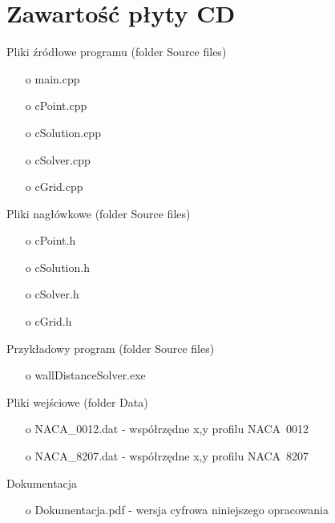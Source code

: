 \chapter{Zawartość płyty CD}

\noindent Pliki źródłowe programu (folder \textsf{Source files})
\begin{itemize}
	\item[o] \textsf{main.cpp} 
	\item[o] \textsf{cPoint.cpp} 
	\item[o] \textsf{cSolution.cpp} 
	\item[o] \textsf{cSolver.cpp} 
	\item[o] \textsf{cGrid.cpp} 
\end{itemize}

\noindent Pliki nagłówkowe (folder \textsf{Source files})
\begin{itemize}
	\item[o] \textsf{cPoint.h} 
	\item[o] \textsf{cSolution.h} 
	\item[o] \textsf{cSolver.h} 
	\item[o] \textsf{cGrid.h} 
\end{itemize}

\noindent Przykładowy program (folder \textsf{Source files})
\begin{itemize}
	\item[o] \textsf{wallDistanceSolver.exe}
\end{itemize}

\noindent Pliki wejściowe (folder \textsf{Data})
\begin{itemize}
	\item[o] \textsf{NACA\_0012.dat} - współrzędne x,y profilu NACA~0012
	\item[o] \textsf{NACA\_8207.dat} - współrzędne x,y profilu NACA~8207
\end{itemize}

\noindent Dokumentacja
\begin{itemize}
	\item[o] \textsf{Dokumentacja.pdf} - wersja cyfrowa niniejszego opracowania
\end{itemize}
